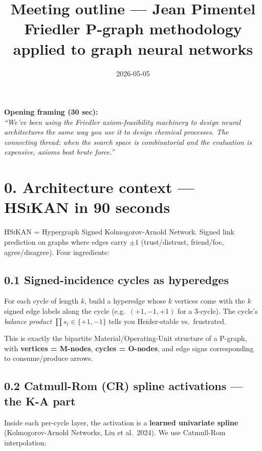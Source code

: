 \documentclass[11pt,a4paper]{article}
\title{Meeting outline — Jean Pimentel\\[3pt]
       \large\normalfont Friedler P-graph methodology applied to graph neural networks}
\author{}
\date{2026-05-05}
\newcommand{\HSiKAN}{\textsc{HSiKAN}}
\begin{document}
\maketitle

\begin{tcolorbox}[colback=soft,colframe=deepblue,boxrule=0.3mm,arc=2pt]
\textbf{Opening framing (30 sec):}
\\[2pt]
\textit{``We've been using the Friedler axiom-feasibility machinery
to design neural architectures the same way you use it to design
chemical processes. The connecting thread: when the search space is
combinatorial and the evaluation is expensive, axioms beat brute
force.''}
\end{tcolorbox}

\section*{0. Architecture context — \HSiKAN{} in 90 seconds}

\HSiKAN{} = Hypergraph Signed Kolmogorov-Arnold Network.
Signed link prediction on graphs where edges carry $\pm 1$
(trust/distrust, friend/foe, agree/disagree). Four ingredients:

\subsection*{0.1 Signed-incidence cycles as hyperedges}
For each cycle of length $k$, build a hyperedge whose $k$ vertices
come with the $k$ signed edge labels along the cycle (e.g.\
$(+1, -1, +1)$ for a 3-cycle). The cycle's \emph{balance product}
$\prod s_i \in \{+1, -1\}$ tells you Heider-stable vs.\ frustrated.

This is exactly the bipartite Material/Operating-Unit structure of a
P-graph, with \textbf{vertices = M-nodes}, \textbf{cycles = O-nodes},
and edge signs corresponding to consume/produce arrows.

\subsection*{0.2 Catmull-Rom (CR) spline activations — the K-A part}
Inside each per-cycle layer, the activation is a \textbf{learned
univariate spline} (Kolmogorov-Arnold Networks, Liu et al.\ 2024).
We use Catmull-Rom interpolation:
\end{document}
